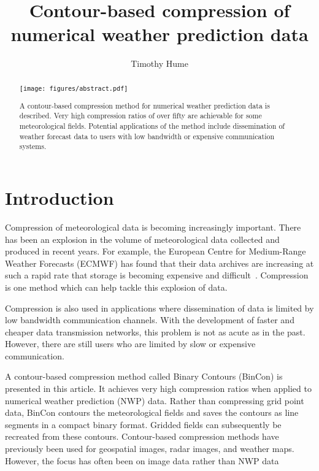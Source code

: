 \documentclass[12pt,a4paper]{article}
\title{Contour-based compression of numerical weather prediction data}
\author{Timothy Hume}
\begin{document}
\maketitle


\begin{abstract}
\begin{center}
\texttt{[image: figures/abstract.pdf]}
\end{center}
A contour-based compression method for numerical weather prediction data is
described. Very high compression ratios of over fifty are achievable for some
meteorological fields. Potential applications of the method include
dissemination of weather forecast data to users with low bandwidth or expensive
communication systems.
\end{abstract}

\section*{Introduction}
\label{sec:introduction}

Compression of meteorological data is becoming increasingly important. There
has been an explosion in the volume of meteorological data collected and
produced in recent years. For example, the European Centre for Medium-Range
Weather Forecasts (ECMWF) has found that their data archives are increasing at
such a rapid rate that storage is becoming expensive and
difficult~\citep{burton_cruz2020}. Compression is one method which can help
tackle this explosion of data.

Compression is also used in applications where dissemination of data is limited
by low bandwidth communication channels. With the development of faster and
cheaper data transmission networks, this problem is not as acute as in the
past. However, there are still users who are limited by slow or expensive
communication.

A contour-based compression method called Binary Contours (BinCon) is
presented in this article. It achieves very high compression ratios when
applied to numerical weather prediction (NWP) data. Rather than
compressing grid point data, BinCon contours the meteorological fields
and saves the contours as line segments in a compact binary format. Gridded
fields can subsequently be recreated from these contours. Contour-based
compression methods have previously been used for geospatial images, radar
images, and weather maps. However, the focus has often been on image data
rather than NWP data~\citep[see][]{scarmana2011,
mahapatra_makkapati2005, gertz_grappel1994}
\end{document}
